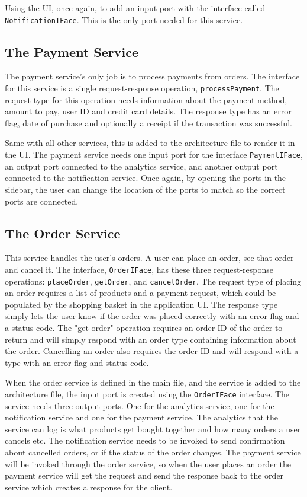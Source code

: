 Using the UI, once again, to add an input port with the interface called \texttt{NotificationIFace}. This is the only port needed for this service.

\subsection{The Payment Service}
The payment service's only job is to process payments from orders. The interface for this service is a single request-response operation, \texttt{processPayment}.
The request type for this operation needs information about the payment method, amount to pay, user ID and credit card details. The response type has an error flag, date of purchase and optionally a receipt if the transaction was successful.

Same with all other services, this is added to the architecture file to render it in the UI. The payment service needs one input port for the interface \texttt{PaymentIFace}, an output port connected to the analytics service, and another output port connected to the notification service.
Once again, by opening the ports in the sidebar, the user can change the location of the ports to match so the correct ports are connected.

\subsection{The Order Service}
This service handles the user's orders. A user can place an order, see that order and cancel it. The interface, \texttt{OrderIFace}, has these three request-response operations: \texttt{placeOrder}, \texttt{getOrder}, and \texttt{cancelOrder}.
The request type of placing an order requires a list of products and a payment request, which could be populated by the shopping basket in the application UI.
The response type simply lets the user know if the order was placed correctly with an error flag and a status code. The "get order" operation requires an order ID of the order to return and will simply respond with an order type containing information about the order.
Cancelling an order also requires the order ID and will respond with a type with an error flag and status code.

When the order service is defined in the main file, and the service is added to the architecture file, the input port is created using the \texttt{OrderIFace} interface.
The service needs three output ports. One for the analytics service, one for the notification service and one for the payment service. The analytics that the service can log is what products get bought together and how many orders a user cancels etc.
The notification service needs to be invoked to send confirmation about cancelled orders, or if the status of the order changes.
The payment service will be invoked through the order service, so when the user places an order the payment service will get the request and send the response back to the order service which creates a response for the client.

